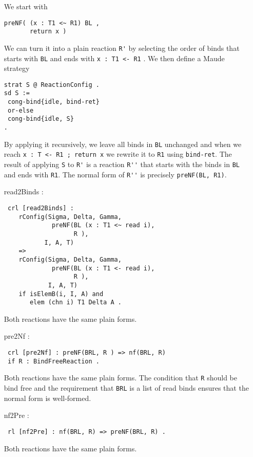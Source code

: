 \documentclass{article}
\begin{document}
\begin{itemize}
\begin{lstlisting}
     \end{lstlisting} 
     
We start with 
\begin{lstlisting}
preNF( (x : T1 <~ R1) BL , 
       return x )           
\end{lstlisting}        
We can turn it into a plain reaction \verb+R'+ by selecting the order of binds
that starts with \verb+BL+ and ends with \verb+x : T1 <- R1+ . 
We then define a Maude strategy 
\begin{lstlisting}
strat S @ ReactionConfig .
sd S := 
 cong-bind{idle, bind-ret}
 or-else
 cong-bind{idle, S}
.
     \end{lstlisting}
By applying it recursively, we leave all binds in \verb+BL+ unchanged and 
when we reach
\verb+x : T <- R1 ; return x+ we rewrite it to \verb+R1+ 
using \verb+bind-ret+.
The result of applying \verb+S+ to \verb+R'+ is a reaction \verb+R''+ 
that starts with the binds in \verb+BL+ 
and ends with \verb+R1+.
The normal form of \verb+R''+ is precisely 
\verb+preNF(BL, R1)+.     
 
\item[read2Binds]:
\begin{lstlisting}       
 crl [read2Binds] : 
    rConfig(Sigma, Delta, Gamma, 
             preNF(BL (x : T1 <~ read i), 
                   R ), 
           I, A, T) 
    =>
    rConfig(Sigma, Delta, Gamma, 
             preNF(BL (x : T1 <- read i), 
                   R ), 
            I, A, T) 
    if isElemB(i, I, A) and 
       elem (chn i) T1 Delta A .
    \end{lstlisting} 
    
 Both reactions have the same plain forms.   
 
\item[pre2Nf]:
\begin{lstlisting}  
 crl [pre2Nf] : preNF(BRL, R ) => nf(BRL, R) 
 if R : BindFreeReaction . 
    \end{lstlisting} 
    
 Both reactions have the same plain forms.  
 The condition that \verb+R+ should be bind free and
 the requirement that \verb+BRL+ is a list of read binds
 ensures that the normal form is well-formed.
 
\item[nf2Pre]:
\begin{lstlisting}
 rl [nf2Pre] : nf(BRL, R) => preNF(BRL, R) .
     \end{lstlisting} 
 
 Both reactions have the same plain forms. 
 

\end{itemize}
\end{document}
